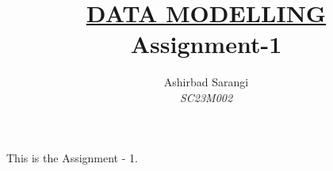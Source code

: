 \documentclass[a4paper, 12pt]{article}
\title{\underline{DATA MODELLING} \\Assignment-1}
\author{Ashirbad Sarangi \\\textit{SC23M002}}
\date{}
\begin{document}
\maketitle

This is the Assignment - 1.
\end{document}
